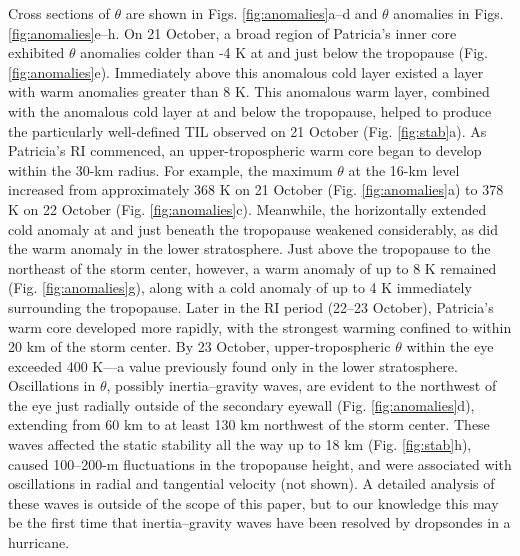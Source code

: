 Cross sections of $\theta$ are shown in Figs. \ref{fig:anomalies}a--d and $\theta$ anomalies in Figs. \ref{fig:anomalies}e–h.
On 21 October, a broad region of Patricia’s inner core exhibited $\theta$ anomalies colder than -4 K at and just below the tropopause (Fig. \ref{fig:anomalies}e).
Immediately above this anomalous cold layer existed a layer with warm anomalies greater than 8 K.
This anomalous warm layer, combined with the anomalous cold layer at and below the tropopause, helped to produce the particularly well-defined TIL observed on 21 October (Fig. \ref{fig:stab}a).
As Patricia’s RI commenced, an upper-tropospheric warm core began to develop within
the 30-km radius.
For example, the maximum $\theta$ at the 16-km level increased from approximately 368 K on 21 October (Fig. \ref{fig:anomalies}a) to 378 K on 22 October (Fig. \ref{fig:anomalies}c).
Meanwhile, the horizontally extended cold anomaly at and just beneath the tropopause weakened considerably, as did the warm anomaly in the lower stratosphere.
Just above the tropopause to the northeast of the storm center, however, a warm anomaly of up to 8 K remained (Fig. \ref{fig:anomalies}g), along with a cold anomaly of up to 4 K immediately surrounding the tropopause.
Later in the RI period (22--23 October), Patricia’s warm core developed more rapidly, with the strongest warming confined to within 20 km of the storm center.
By 23 October, upper-tropospheric $\theta$ within the eye exceeded 400 K---a value previously found only in the lower stratosphere.
Oscillations in $\theta$, possibly inertia--gravity waves, are evident to the northwest of the eye just radially outside of the secondary eyewall (Fig. \ref{fig:anomalies}d), extending from 60 km to at least 130 km northwest of the storm center.
These waves affected the static stability all the way up to 18 km (Fig. \ref{fig:stab}h), caused 100--200-m fluctuations in the tropopause height, and were associated with oscillations in radial and tangential velocity (not shown).
A detailed analysis of these waves is outside of the scope of this paper, but to our knowledge this may be the first time that inertia--gravity waves have been resolved by dropsondes in a hurricane.

